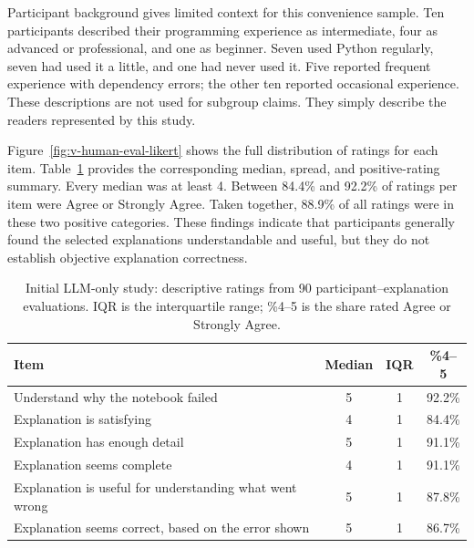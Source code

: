 Participant background gives limited context for this convenience sample. Ten
participants described their programming experience as intermediate, four as
advanced or professional, and one as beginner. Seven used Python regularly,
seven had used it a little, and one had never used it. Five reported frequent
experience with dependency errors; the other ten reported occasional
experience. These descriptions are not used for subgroup claims. They simply
describe the readers represented by this study.

\label{sec:v-human-eval-pool}
\label{sec:v-human-eval-analysis}
\label{sec:v-human-eval-limitations}

Figure~\ref{fig:v-human-eval-likert} shows the full distribution of ratings
for each item. Table~\ref{tab:v-human-eval-results-current} provides the
corresponding median, spread, and positive-rating summary. Every median was at
least 4. Between 84.4\% and 92.2\% of ratings per item were Agree or Strongly
Agree. Taken together, 88.9\% of all ratings were in these two positive
categories. These findings indicate that participants generally found the
selected explanations understandable and useful, but they do not establish
objective explanation correctness.

\begin{table}[htbp]
  \centering
  \small
  \begin{tabular}{|p{7.0cm}|c|c|c|}
    \hline
    \textbf{Item} & \textbf{Median} & \textbf{IQR} & \textbf{\%4--5} \\
    \hline
    Understand why the notebook failed & 5 & 1 & 92.2\% \\
    \hline
    Explanation is satisfying & 4 & 1 & 84.4\% \\
    \hline
    Explanation has enough detail & 5 & 1 & 91.1\% \\
    \hline
    Explanation seems complete & 4 & 1 & 91.1\% \\
    \hline
    Explanation is useful for understanding what went wrong & 5 & 1 & 87.8\% \\
    \hline
    Explanation seems correct, based on the error shown & 5 & 1 & 86.7\% \\
    \hline
  \end{tabular}
  \caption{Initial LLM-only study: descriptive ratings from 90
  participant--explanation evaluations. IQR is the interquartile range;
  \%4--5 is the share rated Agree or Strongly Agree.}
  \label{tab:v-human-eval-results-current}
\end{table}

